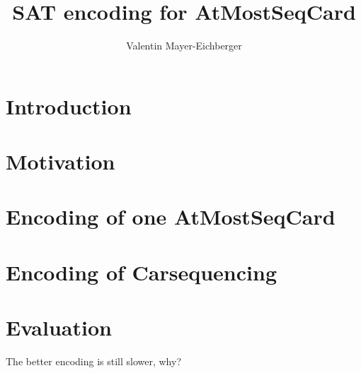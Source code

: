 \documentclass[]{llncs}
\author{Valentin Mayer-Eichberger}
\institute{UNSW \\ Sydney\\
\email{mayereichberger@gmail.com}}
\title{SAT encoding for AtMostSeqCard}
\begin{document}
 \maketitle

\section{Introduction}

\section{Motivation}

\section{Encoding of one AtMostSeqCard}

\section{Encoding of Carsequencing}

\section{Evaluation}

The better encoding is still slower, why?
\end{document}
